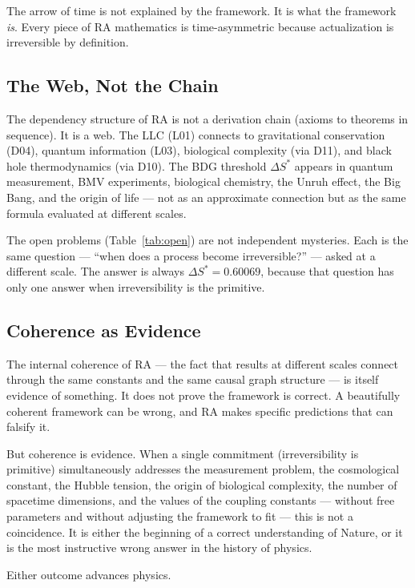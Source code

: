 \documentclass[12pt,a4paper]{article}
\begin{document}
The arrow of time is not explained by the framework.  It is what the framework \emph{is}.  Every piece of RA mathematics is time-asymmetric because actualization is irreversible by definition.

\subsection{The Web, Not the Chain}

The dependency structure of RA is not a derivation chain (axioms to theorems in sequence).  It is a web.  The LLC (L01) connects to gravitational conservation (D04), quantum information (L03), biological complexity (via D11), and black hole thermodynamics (via D10).  The BDG threshold $\Delta S^*$ appears in quantum measurement, BMV experiments, biological chemistry, the Unruh effect, the Big Bang, and the origin of life --- not as an approximate connection but as the same formula evaluated at different scales.

The open problems (Table~\ref{tab:open}) are not independent mysteries.  Each is the same question --- ``when does a process become irreversible?'' --- asked at a different scale.  The answer is always $\Delta S^*=0.60069$, because that question has only one answer when irreversibility is the primitive.

\subsection{Coherence as Evidence}

The internal coherence of RA --- the fact that results at different scales connect through the same constants and the same causal graph structure --- is itself evidence of something.  It does not prove the framework is correct.  A beautifully coherent framework can be wrong, and RA makes specific predictions that can falsify it.

But coherence is evidence.  When a single commitment (irreversibility is primitive) simultaneously addresses the measurement problem, the cosmological constant, the Hubble tension, the origin of biological complexity, the number of spacetime dimensions, and the values of the coupling constants --- without free parameters and without adjusting the framework to fit --- this is not a coincidence.  It is either the beginning of a correct understanding of Nature, or it is the most instructive wrong answer in the history of physics.

Either outcome advances physics.
\end{document}
